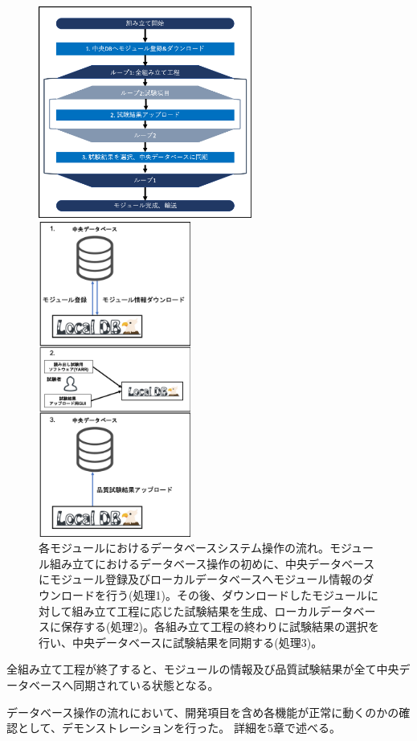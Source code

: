 \begin{figure}[bpt]\centering
  \begin{minipage}{0.5\hsize}
    \includegraphics[width=7cm]{dbsystem_flowchart}
  \end{minipage}
  \begin{minipage}{0.4\hsize}
    \includegraphics[width=5cm]{dbsystem_flow_image}
  \end{minipage}
\caption[各モジュールにおけるデータベースシステム操作の流れ]{各モジュールにおけるデータベースシステム操作の流れ。モジュール組み立てにおけるデータベース操作の初めに、中央データベースにモジュール登録及びローカルデータベースへモジュール情報のダウンロードを行う(処理1)。その後、ダウンロードしたモジュールに対して組み立て工程に応じた試験結果を生成、ローカルデータベースに保存する(処理2)。各組み立て工程の終わりに試験結果の選択を行い、中央データベースに試験結果を同期する(処理3)。}
\label{dbsystem_flow}
\end{figure}

全組み立て工程が終了すると、モジュールの情報及び品質試験結果が全て中央データベースへ同期されている状態となる。

データベース操作の流れにおいて、開発項目を含め各機能が正常に動くのかの確認として、デモンストレーションを行った。
詳細を5章で述べる。

